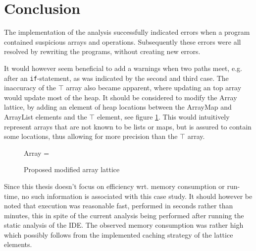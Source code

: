 \newpage\section{Conclusion}

The implementation of the analysis successfully indicated errors when a program contained suspicious arrays and operations. Subsequently these errors were all resolved by rewriting the programs, without creating new errors. 

It would however seem beneficial to add a warnings when two paths meet, e.g. after an \texttt{if}-statement, as was indicated by the second and third case. The inaccuracy of the $\top$ array also became apparent, where updating an top array would update most of the heap. It should be considered to modify the Array lattice, by adding an element of heap locations between the ArrayMap and ArrayList elements and the $\top$ element, see figure \ref{fig:newArray}. This would intuitively represent arrays that are not known to be lists or maps, but is assured to contain some locations, thus allowing for more precision than the $\top$ array. 

\begin{figure}
\centering
Array = 
\caption{Proposed modified array lattice}
\label{fig:newArray}
\end{figure}

Since this thesis doesn't focus on efficiency wrt. memory consumption or run-time, no such information is associated with this case study. It should however be noted that execution was reasonable fast, performed in seconds rather than minutes, this in spite of the current analysis being performed after running the static analysis of the IDE. The observed memory consumption was rather high which possibly follows from the implemented caching strategy of the lattice elements.  
